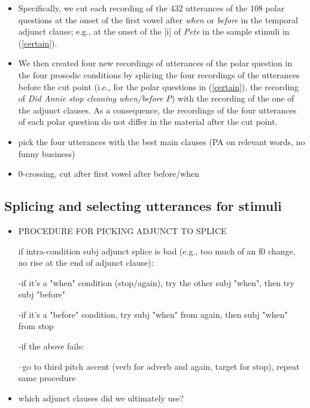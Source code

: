 \documentclass[a4paper,12pt]{article}
\newcommand{\6}{\mbox{$[\hspace*{-.6mm}[$}}
\newcommand{\9}{\mbox{$]\hspace*{-.6mm}]$}}
\begin{document}
\begin{itemize}

\item Specifically, we cut each recording of the 432 utterances of the 108 polar questions at the onset of the first vowel after {\em when} or {\em before} in the temporal adjunct clause; e.g., at the onset of the [i] of {\em Pete} in the sample stimuli in (\ref{certain}).

\item We then created four new recordings of utterances of the polar question in the four prosodic conditions by splicing the four recordings of the utterances before the cut point (i.e., for the polar questions in (\ref{certain}), the recording of {\em Did Annie stop cleaning when/before P}) with the recording of the one of the adjunct clauses. As a consequence, the recordings of the four utterances of each polar question do not differ in the material after the cut point.

\item pick the four utterances with the best main clauses (PA on relevant words, no funny business)

\item 0-crossing, cut after first vowel after before/when

\end{itemize}

\subsection{Splicing and selecting utterances for stimuli}

\begin{itemize}

\item PROCEDURE FOR PICKING ADJUNCT TO SPLICE

if intra-condition subj adjunct splice is bad (e.g., too much of an f0 change, no rise at the end of adjunct clause):

-if it's a "when" condition (stop/again), try the other subj "when", then try subj "before"

-if it's a "before" condition, try subj "when" from again, then subj "when" from stop

-if the above fails:

--go to third pitch accent (verb for adverb and again, target for stop), repeat same procedure

\item which adjunct clauses did we ultimately use?

\end{itemize}
\end{document}

